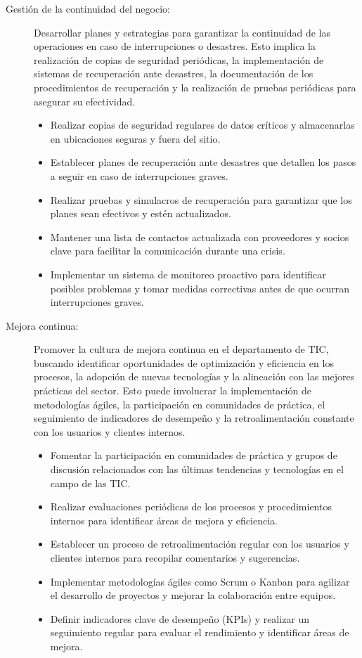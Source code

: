 \documentclass{article}
\begin{document}
\begin{description}
    \item[Gestión de la continuidad del negocio:] Desarrollar planes y estrategias para garantizar la continuidad de las operaciones en caso de interrupciones o desastres. Esto implica la realización de copias de seguridad periódicas, la implementación de sistemas de recuperación ante desastres, la documentación de los procedimientos de recuperación y la realización de pruebas periódicas para asegurar su efectividad.
    \begin{itemize}[label=$\circ$]
        \item Realizar copias de seguridad regulares de datos críticos y almacenarlas en ubicaciones seguras y fuera del sitio.
        \item Establecer planes de recuperación ante desastres que detallen los pasos a seguir en caso de interrupciones graves.
        \item Realizar pruebas y simulacros de recuperación para garantizar que los planes sean efectivos y estén actualizados.
        \item Mantener una lista de contactos actualizada con proveedores y socios clave para facilitar la comunicación durante una crisis.
        \item Implementar un sistema de monitoreo proactivo para identificar posibles problemas y tomar medidas correctivas antes de que ocurran interrupciones graves.
    \end{itemize}
    
    \item[Mejora continua:] Promover la cultura de mejora continua en el departamento de TIC, buscando identificar oportunidades de optimización y eficiencia en los procesos, la adopción de nuevas tecnologías y la alineación con las mejores prácticas del sector. Esto puede involucrar la implementación de metodologías ágiles, la participación en comunidades de práctica, el seguimiento de indicadores de desempeño y la retroalimentación constante con los usuarios y clientes internos.
    \begin{itemize}[label=$\circ$]
        \item Fomentar la participación en comunidades de práctica y grupos de discusión relacionados con las últimas tendencias y tecnologías en el campo de las TIC.
        \item Realizar evaluaciones periódicas de los procesos y procedimientos internos para identificar áreas de mejora y eficiencia.
        \item Establecer un proceso de retroalimentación regular con los usuarios y clientes internos para recopilar comentarios y sugerencias.
        \item Implementar metodologías ágiles como Scrum o Kanban para agilizar el desarrollo de proyectos y mejorar la colaboración entre equipos.
        \item Definir indicadores clave de desempeño (KPIs) y realizar un seguimiento regular para evaluar el rendimiento y identificar áreas de mejora.
    \end{itemize}
\end{description}
\end{document}
